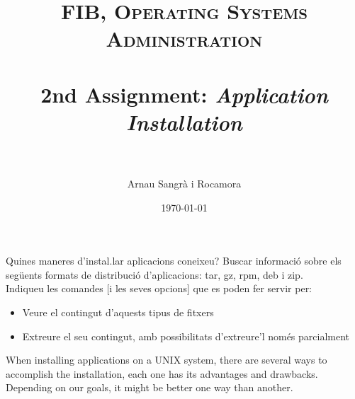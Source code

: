 \documentclass[10pt,a4paper]{article}
\title{
	\normalfont \normalsize 
	\textsc{FIB, Operating Systems Administration} \\ [25pt] %
	\horrule{0.5pt} \\[0.4cm] %
	\huge 2nd Assignment: \textit{Application Installation}\\ %
	\horrule{2pt} \\[0.5cm] %
}
\author{Arnau Sangrà i Rocamora}
\date{\normalsize\today} %
\begin{document}
	\maketitle
	
	Quines maneres d'instal.lar aplicacions coneixeu? Buscar informació sobre els següents formats de distribució d'aplicacions: tar, gz, rpm, deb i zip.\\
	Indiqueu les comandes [i les seves opcions] que es poden fer servir per:
	\begin{itemize}
		\item Veure el contingut d'aquests tipus de fitxers
		\item Extreure el seu contingut, amb possibilitats d'extreure'l només parcialment
	\end{itemize}
	\color{darkblue}
	When installing applications on a UNIX system, there are several ways to accomplish the installation, each one has its advantages and drawbacks. Depending on our goals, it might be better one way than another.\\
	
\end{document}
